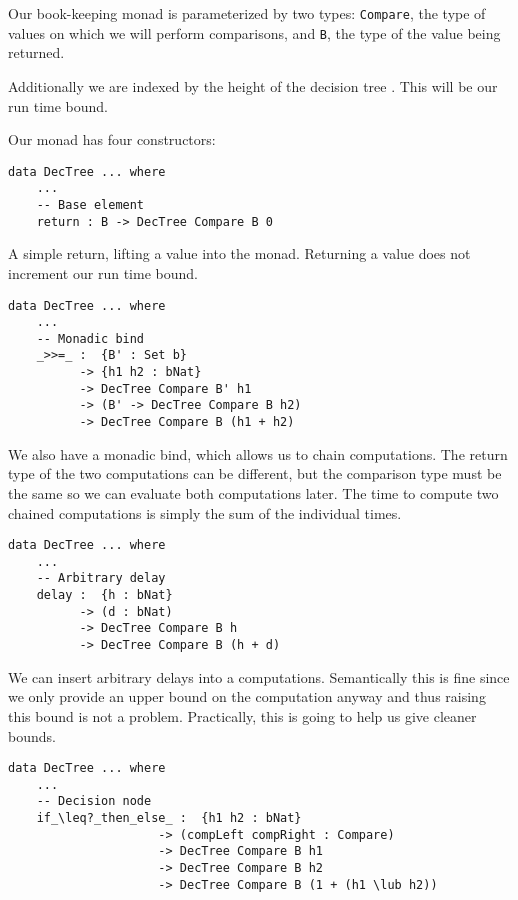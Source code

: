 Our book-keeping monad is parameterized by two types: \texttt{Compare}, the type of values on which we will perform comparisons, and \texttt{B}, the type of the value being returned.

Additionally we are indexed by the height of the decision tree . This will be our run time bound.

Our monad has four constructors:

\begin{lstlisting}[caption={The DecTree Monad},label={lst:dectree:2},emph={DecTree,return}]
data DecTree ... where
    ...
    -- Base element
    return : B -> DecTree Compare B 0
\end{lstlisting}

A simple return, lifting a value into the monad. Returning a value does not increment our run time bound.

\begin{lstlisting}[caption={The DecTree Monad},label={lst:dectree:3},emph={DecTree}]
data DecTree ... where
    ...
    -- Monadic bind
    _>>=_ :  {B' : Set b}
          -> {h1 h2 : bNat}
          -> DecTree Compare B' h1
          -> (B' -> DecTree Compare B h2)
          -> DecTree Compare B (h1 + h2)
\end{lstlisting}

We also have a monadic bind, which allows us to chain computations. The return type of the two computations can be different, but the comparison type must be the same so we can evaluate both computations later. The time to compute two chained computations is simply the sum of the individual times.

\begin{lstlisting}[caption={The DecTree Monad},label={lst:dectree:4},emph={DecTree,delay}]
data DecTree ... where
    ...
    -- Arbitrary delay
    delay :  {h : bNat}
          -> (d : bNat)
          -> DecTree Compare B h
          -> DecTree Compare B (h + d)
\end{lstlisting}

We can insert arbitrary delays into a computations. Semantically this is fine since we only provide an upper bound on the computation anyway and thus raising this bound is not a problem. Practically, this is going to help us give cleaner bounds.

\begin{lstlisting}[caption={The DecTree Monad},label={lst:dectree:5},emph={DecTree,if,then,else}]
data DecTree ... where
    ...
    -- Decision node
    if_\leq?_then_else_ :  {h1 h2 : bNat}
                     -> (compLeft compRight : Compare)
                     -> DecTree Compare B h1
                     -> DecTree Compare B h2
                     -> DecTree Compare B (1 + (h1 \lub h2))
\end{lstlisting}

